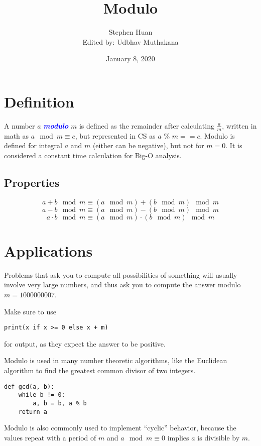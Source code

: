 \documentclass[11pt, oneside]{article}
\title{Modulo}
\author{Stephen Huan \\ Edited by: Udbhav Muthakana}
\date{January 8, 2020}
\newcommand{\emphasis}[1]{\textcolor{blue}{\textbf{\textit{#1}}}}
\begin{document}
\maketitle

\section{Definition}

A number \( a \) \emphasis{modulo} \( m \) is defined as the remainder after calculating \( \frac{a}{m} \),
written in math as \( a \mod m \equiv c \), but represented in CS as \( a \) \(\%\) \( m == c \).
Modulo is defined for integral \( a \) and \( m \) (either can be negative), but not for \( m = 0 \).
It is considered a constant time calculation for Big-O analysis.

\subsection{Properties}

\[ a + b \mod m \equiv (a \mod m) + (b \mod m) \mod m \]
\[ a - b \mod m \equiv (a \mod m) - (b \mod m) \mod m \]
\[ a \cdot b \mod m \equiv (a \mod m) \cdot (b \mod m) \mod m \]

\section{Applications}

Problems that ask you to compute all possibilities of something will usually involve very large numbers,
and thus ask you to compute the answer modulo \( m = 1000000007 \).

\noindent
Make sure to use
\begin{verbatim}
print(x if x >= 0 else x + m)
\end{verbatim}
for output, as they expect the answer to be positive.

Modulo is used in many number theoretic algorithms, like the Euclidean algorithm to find the greatest common divisor of two integers.

\begin{verbatim}
def gcd(a, b):
    while b != 0:
        a, b = b, a % b
    return a
\end{verbatim}

Modulo is also commonly used to implement ``cyclic'' behavior, because the values repeat with a period
of \( m \) and \( a \mod m \equiv 0 \) implies \( a \) is divisible by \( m \).
\end{document}
